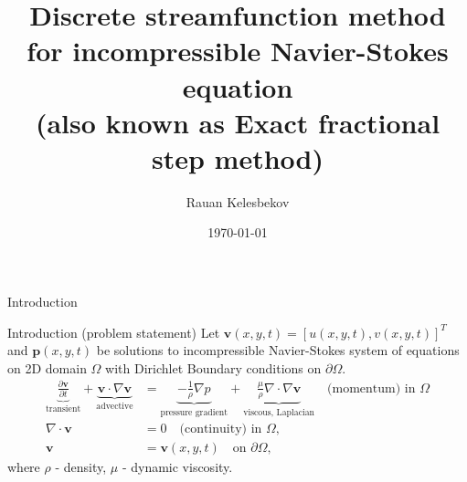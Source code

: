 \documentclass{beamer}
\title{Discrete streamfunction method for incompressible Navier-Stokes equation\\
(also known as Exact fractional step method)}
\date{\today}
\author{Rauan Kelesbekov}
\institute{University of Alberta}
\begin{document}
  \maketitle
  \begin{frame}{Introduction}
	\begin{figure}[H] %
	\end{figure}
	\end{frame}
  
  	\begin{frame}{Introduction (problem statement)}
  	Let $\boldsymbol{v}(x,y,t)=[u(x,y,t),v(x,y,t)]^T$ and $\boldsymbol{p}(x,y,t)$ be solutions to incompressible Navier-Stokes system of equations on 2D domain $\Omega$ with Dirichlet Boundary conditions on $\partial\Omega$.
	\begin{subequations}
	\label{eqs:NSE}
	\begin{align}
	\label{eqn:momentum-intro}
	\underbrace{\frac{\partial \boldsymbol{v}}{\partial t}}_{\text{transient}} 
		+ \underbrace{\boldsymbol{v} \cdot \nabla \boldsymbol{v}}_{\text{advective}} 
		&= \underbrace{-\frac{1}{\rho}\nabla p}_{\text{pressure gradient}} 
		+ \underbrace{\frac{\mu}{\rho} \nabla \cdot \nabla \boldsymbol{v}}_{\text{viscous, Laplacian}}\quad\text{(momentum) in }\Omega\\
	\label{eqn:continuity}
	\nabla \cdot \boldsymbol{v} &= 0\quad\text{(continuity) in }\Omega,\\
	\boldsymbol{v}&=\boldsymbol{v}(x,y,t)\quad\text{on }\partial\Omega,
	\end{align}
	\end{subequations}
	where $\rho$ - density, $\mu$ - dynamic viscosity.
  \end{frame}
  
\end{document}
